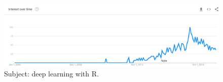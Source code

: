 \documentclass[letter,8pt]{article}\usepackage[]{graphicx}\usepackage[]{color}
\begin{document}
\begin{figure}[!h]
\centering
\includegraphics[width=\textwidth] {figure/deep_learning_r_trend.png}
\caption{Subject: deep learning with R.}
\label{fig:conclusion}
\end{figure}

\newpage
\pagestyle{plain}

\end{document}
